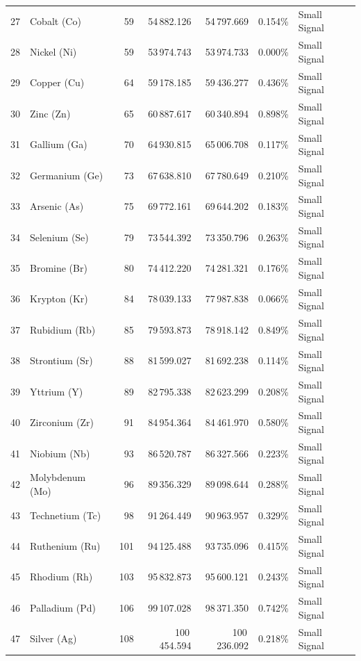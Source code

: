 \begin{small}
\begin{longtable}{r l r r r r l}
27 & Cobalt (Co)     & 59 & 54\,882.126 & 54\,797.669 & 0.154\% & Small Signal \\
28 & Nickel (Ni)     & 59 & 53\,974.743 & 53\,974.733 & 0.000\% & Small Signal \\
29 & Copper (Cu)     & 64 & 59\,178.185 & 59\,436.277 & 0.436\% & Small Signal \\
30 & Zinc (Zn)       & 65 & 60\,887.617 & 60\,340.894 & 0.898\% & Small Signal \\
31 & Gallium (Ga)    & 70 & 64\,930.815 & 65\,006.708 & 0.117\% & Small Signal \\
32 & Germanium (Ge)  & 73 & 67\,638.810 & 67\,780.649 & 0.210\% & Small Signal \\
33 & Arsenic (As)    & 75 & 69\,772.161 & 69\,644.202 & 0.183\% & Small Signal \\
34 & Selenium (Se)   & 79 & 73\,544.392 & 73\,350.796 & 0.263\% & Small Signal \\
35 & Bromine (Br)    & 80 & 74\,412.220 & 74\,281.321 & 0.176\% & Small Signal \\
36 & Krypton (Kr)    & 84 & 78\,039.133 & 77\,987.838 & 0.066\% & Small Signal \\
\midrule
37 & Rubidium (Rb)   & 85  & 79\,593.873  & 78\,918.142  & 0.849\% & Small Signal \\
38 & Strontium (Sr)  & 88  & 81\,599.027  & 81\,692.238  & 0.114\% & Small Signal \\
39 & Yttrium (Y)     & 89  & 82\,795.338  & 82\,623.299  & 0.208\% & Small Signal \\
40 & Zirconium (Zr)  & 91  & 84\,954.364  & 84\,461.970  & 0.580\% & Small Signal \\
41 & Niobium (Nb)    & 93  & 86\,520.787  & 86\,327.566  & 0.223\% & Small Signal \\
42 & Molybdenum (Mo) & 96  & 89\,356.329  & 89\,098.644  & 0.288\% & Small Signal \\
43 & Technetium (Tc) & 98  & 91\,264.449  & 90\,963.957  & 0.329\% & Small Signal \\
44 & Ruthenium (Ru)  & 101 & 94\,125.488  & 93\,735.096  & 0.415\% & Small Signal \\
45 & Rhodium (Rh)    & 103 & 95\,832.873  & 95\,600.121  & 0.243\% & Small Signal \\
46 & Palladium (Pd)  & 106 & 99\,107.028  & 98\,371.350  & 0.742\% & Small Signal \\
47 & Silver (Ag)     & 108 & 100\,454.594 & 100\,236.092 & 0.218\% & Small Signal \\

\end{longtable}
\end{small}
